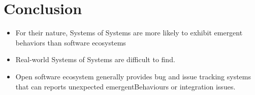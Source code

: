 \chapter{Conclusion}\label{ch:conclusion}
\begin{itemize}
\item For their nature, Systems of Systems are more likely to exhibit emergent
behaviors than software ecosystems 
\item Real-world Systems of Systems are difficult to find.
\item Open software ecosystem generally provides bug and issue tracking systems
that can reports unexpected \gls{emergentBehaviour}s or integration issues.

\end{itemize}